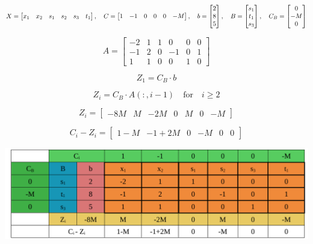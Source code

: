 \[
X = \left[\begin{matrix} x_1 & x_2 & s_1 & s_2 & s_3 & t_1 \end{matrix}\right], \hspace{0.35cm}
C = \left[\begin{matrix} 1 & -1 & 0 & 0 & 0 & -M \end{matrix}\right], \hspace{0.35cm}
b = \left[\begin{matrix} 2 \\ 8 \\ 5 \end{matrix}\right], \hspace{0.35cm}
B = \left[\begin{matrix} s_1 \\ t_1 \\ s_3 \end{matrix}\right], \hspace{0.35cm}
C_B = \left[\begin{matrix} 0 \\ -M \\ 0 \end{matrix}\right]
\]


\vspace{0.5cm}
\[
    A = \left[\begin{matrix} -2 & 1 & 1 & 0  & 0 & 0\\
                             -1 & 2 & 0 & -1 & 0 & 1\\
                              1 & 1 & 0 & 0  & 1 & 0
                            \end{matrix}\right]
\]

\vspace{0.6cm}

\[Z_1 = C_B \cdot b\] 


\[Z_i = C_B \cdot A(:, i-1) \quad \text{for} \quad i \geq 2\] 

\[Z_i =  \left[\begin{matrix} -8M & M & -2M & 0 & M & 0 & -M   \end{matrix}\right]\]

\vspace{0.5cm}

\[C_i-Z_i = \left[\begin{matrix} 1-M & -1+2M & 0 & -M & 0 & 0  \end{matrix}\right]\]

\begin{center}
    \includegraphics{Chapters/Simplexe/EX/EX5/ex5.1.pdf}
\end{center}

